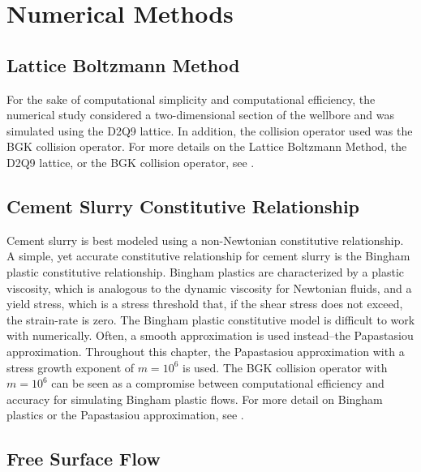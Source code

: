 \documentclass[pdftex,ms]{pittetd}
\begin{document}
\section{Numerical Methods} \label{sec:numerical-methods}

\subsection{Lattice Boltzmann Method}


For the sake of computational simplicity and computational efficiency, the numerical study considered a two-dimensional section of the wellbore and was simulated using the D2Q9 lattice.
In addition, the collision operator used was the BGK collision operator.
For more details on the Lattice Boltzmann Method, the D2Q9 lattice, or the BGK collision operator, see .

\subsection{Cement Slurry Constitutive Relationship}

Cement slurry is best modeled using a non-Newtonian constitutive relationship.
A simple, yet accurate constitutive relationship for cement slurry is the Bingham plastic constitutive relationship.
Bingham plastics are characterized by a plastic viscosity, which is analogous to the dynamic viscosity for Newtonian fluids, and a yield stress, which is a stress threshold that, if the shear stress does not exceed, the strain-rate is zero.
The Bingham plastic constitutive model is difficult to work with numerically.
Often, a smooth approximation is used instead--the Papastasiou approximation.
Throughout this chapter, the Papastasiou approximation with a stress growth exponent of $m = 10^6$ is used.
The BGK collision operator with $m = 10^6$ can be seen as a compromise between computational efficiency and accuracy for simulating Bingham plastic flows.
For more detail on Bingham plastics or the Papastasiou approximation, see .

\subsection{Free Surface Flow}
\end{document}
